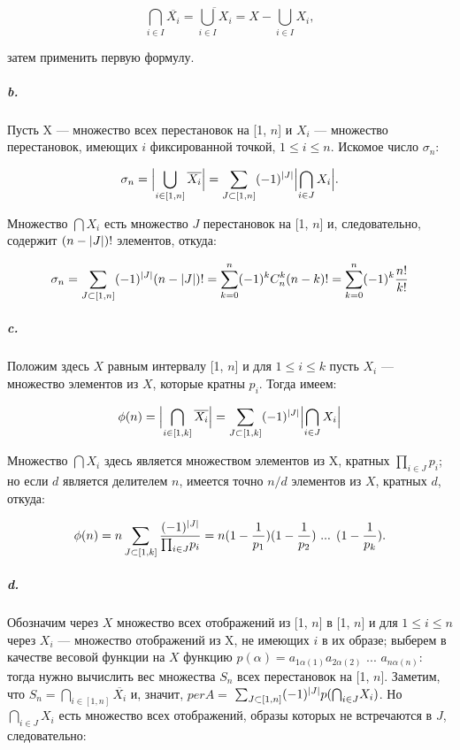 \documentclass{../../template/mai_book}
\DeclarePairedDelimiter{\abs}{\lvert}{\rvert}
\begin{document}
\begin{equation*}
\bigcap_{i \in I} \overline{X_i} = \overline{\bigcup_{i \in I} X_i} = X - \bigcup_{i \in I} X_i,
\end{equation*}

\noindent
затем применить первую формулу.

\subparagraph{b.} Пусть X — множество всех перестановок на [1, $n$] и $X_i$ —  множество перестановок, имеющих $i$ фиксированной точкой, $1 \leqslant i \leqslant n$. Искомое число $\sigma_n$:

\begin{equation*}
\sigma_n = \abs[\Big]{\bigcup_{i \in [1, n]} \overline{X_i}} = \sum_{J \subset [1, n]} (-1)^{\abs{J}} \abs[\Big]{\bigcap_{i \in J} X_i}.
\end{equation*}

\noindent
Множество $\bigcap X_i$ есть множество $J$ перестановок на [1, $n$] и, следовательно, содержит $(n - \abs{J})!$ элементов, откуда:

\begin{equation*}
\sigma_n = \sum_{J \subset [1, n]} (-1)^{\abs{J}} (n - \abs{J})! = \sum_{k = 0}^n (-1)^k C_n^k(n - k)! = \sum_{k = 0}^n (-1)^k \frac{n!}{k!}
\end{equation*}

\newpage


\subparagraph{c.} Положим здесь $X$ равным интервалу [1, $n$] и для $1 \leqslant i \leqslant k$ пусть $X_i$ — множество элементов из $X$, которые кратны $p_i$. Тогда имеем:

\begin{equation*}
\phi(n) = \abs[\Big]{\bigcap_{i \in [1, k]} \overline{X_i}} = \sum_{J \subset [1, k]} (-1)^{\abs{J}} \abs[\Big]{\bigcap_{i \in J} X_i}
\end{equation*}

\noindent
Множество $\bigcap X_i$ здесь является множеством элементов из X, кратных ${\prod}_{i \in J} p_i$; но если $d$ является делителем $n$, имеется точно $n / d$ элементов из $X$, кратных $d$, откуда:

\begin{equation*}
\phi(n) = n \sum_{J \subset [1, k]} \frac{(-1)^{\abs{J}}}{{\prod}_{i \in J} p_i} = n (1 - \frac{1}{p_1}) (1 - \frac{1}{p_2}) \text{ ... } (1 - \frac{1}{p_k}).
\end{equation*}

\subparagraph{d.} Обозначим через $X$ множество всех отображений из [1, $n$] в [1, $n$] и для $1 \leqslant i \leqslant n$ через $X_i$ — множество отображений из X, не имеющих $i$ в их образе; выберем в качестве весовой функции на $X$ функцию $p(\alpha) = a_{1\alpha(1)} a_{2\alpha(2)} \text{ ... } a_{n\alpha(n)}$: тогда нужно вычислить вес множества $S_n$ всех перестановок на [1, $n$]. Заметим, что $S_n = {\bigcap}_{i \in [1, n]} \overline{X_i}$ и, значит, $per A =$ \linebreak ${\sum}_{J \subset [1, n]} (-1)^{\abs{J}} p({\bigcap}_{i \in J} X_i)$. Но ${\bigcap}_{i \in J} X_i$ есть множество всех отображений, образы которых не встречаются в $J$, следовательно:
\end{document}
